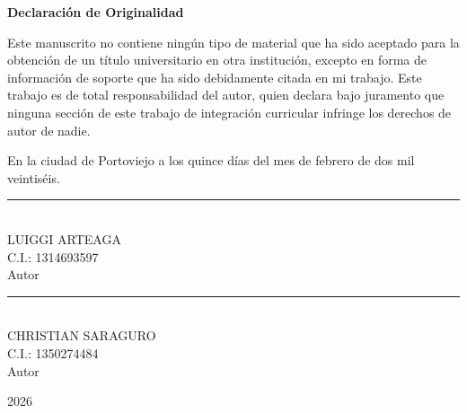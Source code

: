 
\clearpage
    \thispagestyle{plain}

    \begin{center}
        \vspace*{1.7cm}
        \textbf{Declaración de Originalidad}

        \vspace{0.8cm}
        \raggedright
        

        Este manuscrito no contiene ningún tipo de material que ha sido aceptado para la obtención de un título universitario en otra institución, excepto en forma de información de soporte que ha sido debidamente citada en mi trabajo.
        Este trabajo es de total responsabilidad del autor, quien declara bajo juramento que ninguna sección de este trabajo de integración curricular infringe los derechos de autor de nadie.

        En la ciudad de Portoviejo a los quince días del mes de febrero de dos mil veintiséis.
        \par
\vspace{3.0cm}
\centering

\begin{minipage}{0.45\textwidth}
    \centering
    \rule{7cm}{0.4pt} \\ 
    {LUIGGI ARTEAGA} \\
    C.I.: 1314693597 \\
    Autor
\end{minipage}
\hfill
\begin{minipage}{0.45\textwidth}
    \centering
    \rule{7cm}{0.4pt} \\ 
    {CHRISTIAN SARAGURO} \\
    C.I.: 1350274484 \\
    Autor
\end{minipage}


        

        \vspace{5.0cm}

        2026
    \end{center}
\clearpage
